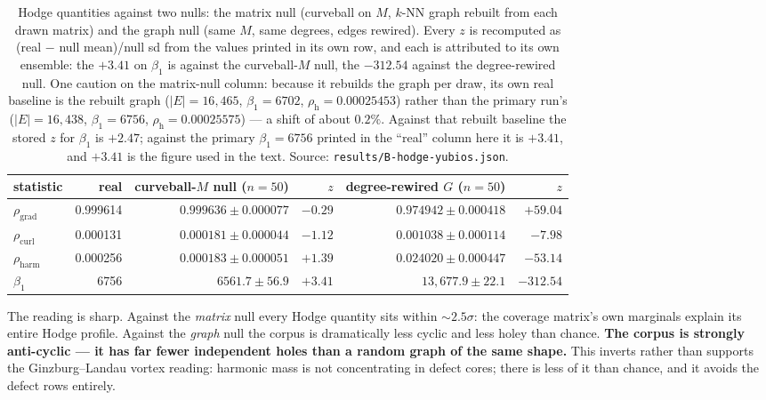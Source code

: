 \documentclass[11pt,a4paper]{article}
\theoremstyle{plain}
\theoremstyle{remark}
\theoremstyle{plain}
\begin{document}
\begin{table}[h]
\centering
\small
\begin{tabular}{lrrrrr}
\toprule
statistic & real & curveball-$M$ null ($n{=}50$) & $z$ & degree-rewired $G$ ($n{=}50$) & $z$ \\
\midrule
$\rho_{\mathrm{grad}}$ & 0.999614 & $0.999636\pm0.000077$ & $-0.29$ & $0.974942\pm0.000418$ & $\mathbf{+59.04}$ \\
$\rho_{\mathrm{curl}}$ & 0.000131 & $0.000181\pm0.000044$ & $-1.12$ & $0.001038\pm0.000114$ & $\mathbf{-7.98}$ \\
$\rho_{\mathrm{harm}}$ & 0.000256 & $0.000183\pm0.000051$ & $+1.39$ & $0.024020\pm0.000447$ & $\mathbf{-53.14}$ \\
$\beta_1$ & 6756 & $6561.7\pm56.9$ & $+3.41$ & $13{,}677.9\pm22.1$ & $\mathbf{-312.54}$ \\
\bottomrule
\end{tabular}
\caption{Hodge quantities against two nulls: the matrix null (curveball on $M$, $k$-NN graph rebuilt from each drawn matrix) and the graph null (same $M$, same degrees, edges rewired). Every $z$ is recomputed as (real $-$ null mean)/null sd from the values printed in its own row, and each is attributed to its own ensemble: the $+3.41$ on $\beta_1$ is against the curveball-$M$ null, the $-312.54$ against the degree-rewired null. One caution on the matrix-null column: because it rebuilds the graph per draw, its own real baseline is the rebuilt graph ($|E|=16{,}465$, $\beta_1=6702$, $\rho_{\mathrm h}=0.00025453$) rather than the primary run's ($|E|=16{,}438$, $\beta_1=6756$, $\rho_{\mathrm h}=0.00025575$) --- a shift of about $0.2\%$. Against that rebuilt baseline the stored $z$ for $\beta_1$ is $+2.47$; against the primary $\beta_1=6756$ printed in the ``real'' column here it is $+3.41$, and $+3.41$ is the figure used in the text. Source: \texttt{results/B-hodge-yubios.json}.}
\label{tab:hodgenulls}
\end{table}

The reading is sharp. Against the \emph{matrix} null every Hodge quantity sits within $\sim\!2.5\sigma$: the coverage matrix's own marginals explain its entire Hodge profile. Against the \emph{graph} null the corpus is dramatically less cyclic and less holey than chance. \textbf{The corpus is strongly anti-cyclic --- it has far fewer independent holes than a random graph of the same shape.} This inverts rather than supports the Ginzburg--Landau vortex reading: harmonic mass is not concentrating in defect cores; there is less of it than chance, and it avoids the defect rows entirely.
\end{document}
